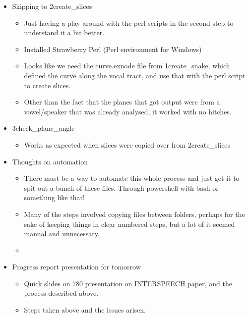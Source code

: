 \documentclass{article}
\begin{document}
\begin{itemize}
    \item Skipping to 2create\_slices
    \begin{itemize}
        \item Just having a play around with the perl scripts in the second step to understand it a bit better.
        \item Installed Strawberry Perl (Perl environment for Windows)
        \item Looks like we need the curve.exnode file from 1create\_snake, which defined the curve along the vocal tract, and use that with the perl script to create slices.
        \item Other than the fact that the planes that got output were from a vowel/speaker that was already analysed, it worked with no hitches.
    \end{itemize}
    
    \item 3check\_plane\_angle
    \begin{itemize}
        \item Works as expected when slices were copied over from 2create\_slices
    \end{itemize}
    
    \item Thoughts on automation
    \begin{itemize}
        \item There must be a way to automate this whole process and just get it to spit out a bunch of these files. Through powershell with bash or something like that!
        \item Many of the steps involved copying files between folders, perhaps for the sake of keeping things in clear numbered steps, but a lot of it seemed manual and unnecessary.
        \item 
    \end{itemize}
    
    \item Progress report presentation for tomorrow
    \begin{itemize}
        \item Quick slides on 780 presentation on INTERSPEECH paper, and the process described above.
        \item Steps taken above and the issues arisen.
    \end{itemize}
    
\end{itemize}
\end{document}
